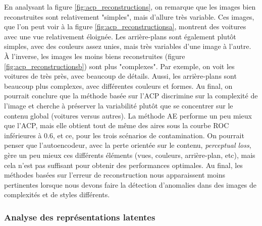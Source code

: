 En analysant la figure \ref{fig:acp_reconstructions}, on remarque que les images bien reconstruites sont relativement "simples", mais d'allure très variable. Ces images, que l'on peut voir à la figure \ref{fig:acp_reconstructionsa}, montrent des voitures avec une vue relativement éloignée. Les arrière-plans sont également plutôt simples, avec des couleurs assez unies, mais très variables d'une image à l'autre. À l'inverse, les images les moins biens reconstruites (figure \ref{fig:acp_reconstructionsb}) sont plus "complexes". Par exemple, on voit les voitures de très près, avec beaucoup de détails. Aussi, les arrière-plans sont beaucoup plus complexes, avec différentes couleurs et formes. Au final, on pourrait conclure que la méthode basée sur l'ACP discrimine sur la complexité de l'image et cherche à préserver la variabilité plutôt que se concentrer sur le contenu global (voitures versus autres). La méthode AE performe un peu mieux que l'ACP, mais elle obtient tout de même des aires sous la courbe ROC inférieures à 0.6, et ce, pour les trois scénarios de contamination. On pourrait penser que l'autoencodeur, avec la perte orientée sur le contenu, \textit{perceptual loss}, gère un peu mieux ces différents éléments (vues, couleurs, arrière-plan, etc), mais cela n'est pas suffisant pour obtenir des performances optimales. Au final, les méthodes basées sur l'erreur de reconstruction nous apparaissent moins pertinentes lorsque nous devons faire la détection d'anomalies dans des images de complexités et de styles différents.


\subsubsection{Analyse des représentations latentes} \label{analyse_lat_cars}

